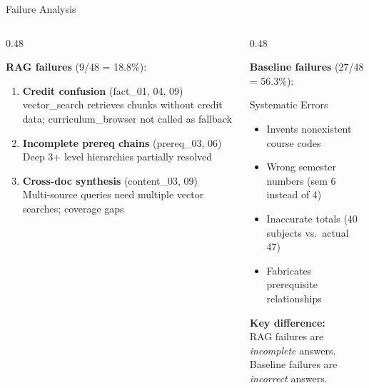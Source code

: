 \documentclass[aspectratio=169,10pt]{beamer}
\begin{document}
\begin{frame}{Failure Analysis}

\begin{columns}[T]
\begin{column}{0.48\textwidth}

\textbf{RAG failures} (9/48 = 18.8\%):

\begin{enumerate}
    \item \textbf{Credit confusion} (fact\_01, 04, 09)\\
    \footnotesize vector\_search retrieves chunks without credit data; curriculum\_browser not called as fallback\normalsize

    \item \textbf{Incomplete prereq chains} (prereq\_03, 06)\\
    \footnotesize Deep 3+ level hierarchies partially resolved\normalsize

    \item \textbf{Cross-doc synthesis} (content\_03, 09)\\
    \footnotesize Multi-source queries need multiple vector searches; coverage gaps\normalsize
\end{enumerate}

\end{column}
\begin{column}{0.48\textwidth}

\textbf{Baseline failures} (27/48 = 56.3\%):

\begin{alertblock}{Systematic Errors}
\footnotesize
\begin{itemize}
    \item Invents nonexistent course codes
    \item Wrong semester numbers (sem 6 instead of 4)
    \item Inaccurate totals (40 subjects vs.\ actual 47)
    \item Fabricates prerequisite relationships
\end{itemize}
\end{alertblock}

\vspace{0.3em}
\textbf{Key difference:}\\
RAG failures are \textit{incomplete} answers.\\
Baseline failures are \textit{incorrect} answers.

\end{column}
\end{columns}

\end{frame}
\end{document}
